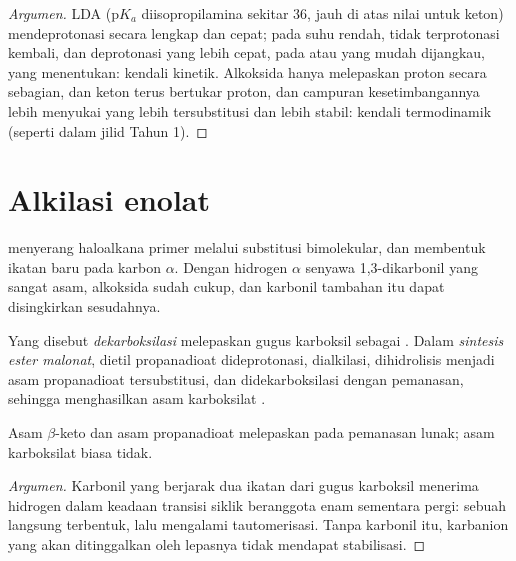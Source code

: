 \begin{proof}[Argumen]
LDA ($\mathrm pK_a$ diisopropilamina sekitar 36, jauh di atas nilai untuk keton)
mendeprotonasi secara lengkap dan cepat; pada suhu rendah,  tidak
terprotonasi kembali, dan deprotonasi yang lebih cepat, pada  atau
 yang mudah dijangkau, yang menentukan: kendali kinetik. Alkoksida
hanya melepaskan proton secara sebagian,  dan keton terus
bertukar proton, dan campuran kesetimbangannya lebih menyukai  yang
lebih tersubstitusi dan lebih stabil: kendali termodinamik (seperti dalam
jilid Tahun 1).
\end{proof}

\section{Alkilasi enolat}

 menyerang haloalkana primer melalui substitusi bimolekular, dan
membentuk ikatan  baru pada karbon $\alpha$. Dengan hidrogen $\alpha$
senyawa 1,3-dikarbonil yang sangat asam, alkoksida sudah cukup, dan karbonil
tambahan itu dapat disingkirkan sesudahnya.

\begin{definition}[Dekarboksilasi]\label{def:b2:enolates-aldol:decarboxylation}
Yang disebut \emph{dekarboksilasi} melepaskan gugus
karboksil sebagai . Dalam \emph{sintesis ester
malonat}, dietil propanadioat dideprotonasi,
dialkilasi, dihidrolisis menjadi asam propanadioat tersubstitusi, dan
didekarboksilasi dengan pemanasan, sehingga menghasilkan asam karboksilat
.
\end{definition}

\begin{proposition}\label{prop:b2:enolates-aldol:decarboxylation}
Asam $\beta$-keto dan asam propanadioat melepaskan  pada pemanasan
lunak; asam karboksilat biasa tidak.
\end{proposition}

\begin{proof}[Argumen]
Karbonil yang berjarak dua ikatan dari gugus karboksil menerima hidrogen
 dalam keadaan transisi siklik beranggota enam sementara 
pergi: sebuah  langsung terbentuk, lalu mengalami tautomerisasi. Tanpa
karbonil itu, karbanion yang akan ditinggalkan oleh lepasnya  tidak
mendapat stabilisasi.
\end{proof}

